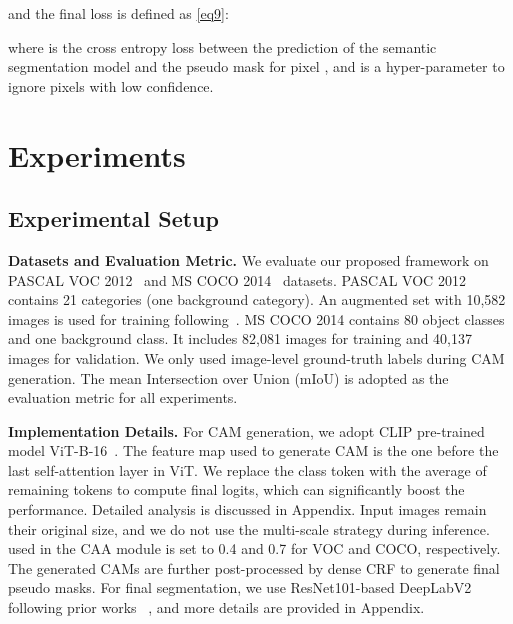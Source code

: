\documentclass[10pt,twocolumn,letterpaper]{article}
\begin{document}
and the final loss is defined as \cref{eq9}:

where  is the cross entropy loss between the prediction of the semantic segmentation model and the pseudo mask for pixel , and  is a hyper-parameter to ignore pixels with low confidence.







\section{Experiments}
\label{sec:experiments}
\subsection{Experimental Setup}




\textbf{Datasets and Evaluation Metric.}
We evaluate our proposed framework on PASCAL VOC 2012~\cite{everingham2010pascal} and MS COCO 2014~\cite{lin2014microsoftcoco} datasets. PASCAL VOC 2012 contains 21 categories (one background category). An augmented set with 10,582 images is used for training following~\cite{Lee2021EPS, Lee2021advcam}. MS COCO 2014 contains 80 object classes and one background class. It includes 82,081 images for training and 40,137 images for validation. We only used image-level ground-truth labels during CAM generation. The mean Intersection over Union (mIoU) is adopted as the evaluation metric for all experiments.

\textbf{Implementation Details.} For CAM generation, we adopt CLIP pre-trained model ViT-B-16~\cite{CLIP}. The feature map used to generate CAM is the one before the last self-attention layer in ViT. We replace the class token with the average of remaining tokens to compute final logits, which can significantly boost the performance. Detailed analysis is discussed in Appendix. Input images remain their original size, and we do not use the multi-scale strategy during inference.  used in the CAA module is set to 0.4 and 0.7 for VOC and COCO, respectively. The generated CAMs are further post-processed by dense CRF\cite{CRF} to generate final pseudo masks. For final segmentation, we use ResNet101-based DeepLabV2 following prior works ~\cite{Lee2021advcam,Lee2021EPS,Xie_2022_CLIMS}, and more details are provided in Appendix.
\end{document}
